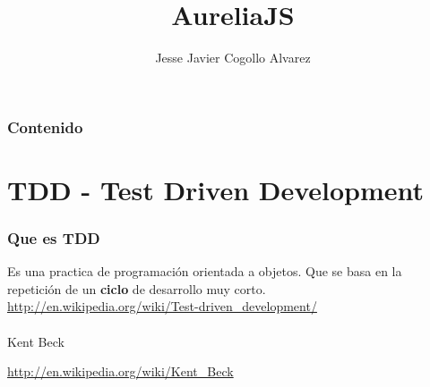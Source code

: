 \documentclass{beamer}
\title[AureliaJS]{AureliaJS} %
\author{Jesse Javier Cogollo Alvarez} %
\institute[EAFIT - TalosDigital] %
{
Developer by passion \\ %
\medskip
\textit{email: cogollo87@gmail.com} \\~\\
\textit{MedellinJS}
}
\begin{document}
\begin{frame}
\titlepage %
\end{frame}

\begin{frame}
\frametitle{Contenido} %
\tableofcontents %
\end{frame}


\section{TDD - Test Driven Development} %
\begin{frame}
\frametitle{Que es TDD}
Es una practica de programaci\'on orientada a objetos. Que se basa en la repetici\'on 
de un \textbf{ciclo} de desarrollo muy corto.
{\color{blue}\url{http://en.wikipedia.org/wiki/Test-driven_development/}}
\\~\\
Kent Beck

{\color{blue}\url{http://en.wikipedia.org/wiki/Kent_Beck}}

\end{frame}
\end{document}

